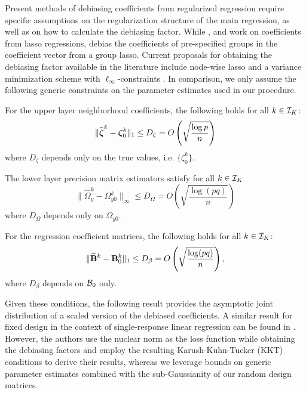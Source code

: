 Present methods of debiasing coefficients from regularized regression require specific assumptions on the regularization structure of the main regression, as well as on how to calculate the debiasing factor. While \cite{ZhangZhang14}, \cite{JavanmardMontanari14} and \cite{vanDeGeerEtal14} work on coefficients from lasso regressions, \cite{MitraZhang16} debias the coefficients of pre-specified groups in the coefficient vector from a group lasso. Current proposals for obtaining the debiasing factor available in the literature include node-wise lasso \citep{ZhangZhang14} and a variance minimization scheme with $\ell_\infty$-constraints \citep{JavanmardMontanari14}. In comparison, we only assume the following generic constraints on the parameter estimates used in our procedure.

\vspace{1em}
 For the upper layer neighborhood coefficients, the following holds for all $k \in {\cal{I}}_K$:
%
$$
\| \widehat {{\boldsymbol{\zeta}}}^k - {\boldsymbol{\zeta}}_0^k \|_1 \leq D_\zeta  = O \left( \sqrt { \frac{\log p}{n}} \right)
$$
%
where $D_\zeta$ depends only on the true values, i.e. $\{ \zeta^k_0 \}$.

 The lower layer precision matrix estimators satisfy for all $k \in {\cal{I}}_K$
%
$$
\| \widehat \Omega_y^k - \Omega_{y0}^k \|_\infty \leq D_\Omega
= O \left( \sqrt { \frac{\log (pq)}{n}} \right)$$
%
where $D_\Omega$ depends only on $\Omega_{y 0}$.

 For the regression coefficient matrices, the following holds for all $k \in {\cal{I}}_K$:
%
$$
\| \widehat {{\mathbf{B}}}^k - {\mathbf{B}}^k_0 \|_1 \leq D_\beta = O \left( \sqrt { \frac{\log (p q)}{n}} \right),
$$
%
where $D_\beta$ depends on ${\cal{B}}_0$ only.
\vspace{1em}

Given these conditions, the following result provides the asymptotic joint distribution of a scaled version of the debiased coefficients. A similar result for fixed design in the context of single-response linear regression can be found in \cite{StuckyVandeGeer17}. However, the authors use the nuclear norm as the loss function while obtaining the debiasing factors and employ the resulting Karush-Kuhn-Tucker (KKT) conditions to derive their results, whereas we leverage bounds on generic parameter estimates combined with the sub-Gaussianity of our random design matrices.

